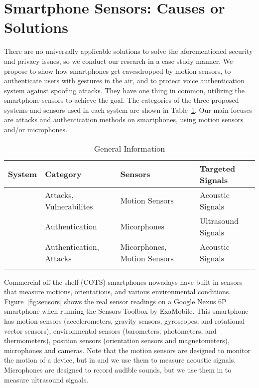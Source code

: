 \section{Smartphone Sensors: Causes  or Solutions}
There are no universally applicable solutions to solve the aforementioned security and privacy issues, so we conduct our research in a case study manner. We propose {\spp} to show how smartphones get eavesdropped  by motion sensors, {\uu} to authenticate users with gestures in the air, and {\mv} to protect voice authentication system against spoofing attacks. They have one thing in common, utilizing the smartphone sensors to achieve the goal. The categories of the three proposed systems and sensors used in each system are shown in Table~\ref{tab:general}. Our main focuses are attacks and authentication methods on smartphones, using motion sensors and/or microphones.

\begin{table}
	\caption{General Information}
	\label{tab:general}
	\centering
	\begin{tabular}{llll}
		\toprule
		System & Category & Sensors & Targeted Signals\\
		\midrule
		{\spp} 	& Attacks, Vulnerabilites & Motion Sensors& Acoustic Signals\\
		{\uu}& Authentication & Micorphones& Ultrasound Signals\\
		{\mv}& Authentication, Attacks & Micorphones, Motion Sensors & Acoustic Signals\\
		\bottomrule& 
	\end{tabular}
\end{table}

Commercial off-the-shelf (COTS) smartphones nowadays have built-in sensors that measure motions, orientations, and various environmental conditions. Figure~\ref{fig:sensors} shows the real sensor readings on a Google Nexus 6P smartphone when running the Sensors Toolbox by ExaMobile. This smartphone has motion sensors (accelerometers, gravity sensors, gyroscopes, and rotational vector sensors), environmental sensors (barometers, photometers, and thermometers), position sensors (orientation sensors and magnetometers), microphones and cameras. Note that the motion sensors are designed to monitor the motion of a device, but in {\spp} and {\mv} we use them to measure acoustic signals. Microphones are designed to record audible sounds, but we use them in {\uu} to measure ultrasound signals.

